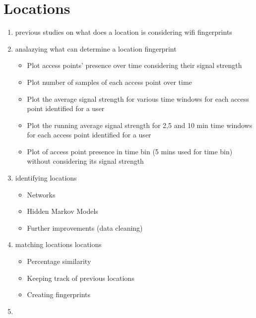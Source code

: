 \chapter{Locations}
\label{locations}
\begin{enumerate}
  \item previous studies on what does a location is considering wifi
  fingerprints
  \item analazying what can determine a location fingerprint
	\begin{itemize}
		\item Plot access points’ presence over time considering their signal strength
		\item Plot number of samples of each access point over time
		\item Plot the average signal strength for various time windows for each
		access point identified for a user
		\item Plot the running average signal strength for 2,5 and 10 min time windows
		for each access point identified for a user
		\item Plot of access point presence in time bin (5 mins used for time bin)
		without considering its signal strength
	\end{itemize}
  \item identifying locations
	\begin{itemize}
		\item Networks 
		\item Hidden Markov Models 
		\item Further improvements (data cleaning)
	\end{itemize}
  \item matching locations locations
	\begin{itemize}
		\item Percentage similarity 
		\item Keeping track of previous locations 
		\item Creating fingerprints
	\end{itemize}
  \item  
\end{enumerate}